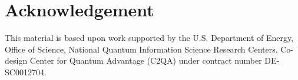\section*{Acknowledgement}
This material is based upon work supported by the U.S. Department
of Energy, Office of Science, National Quantum Information Science Research Centers, Co-design Center for Quantum Advantage
(C2QA) under contract number DE-SC0012704.